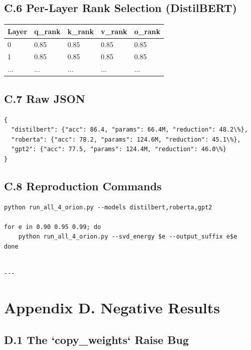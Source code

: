 \subsection{C.6 Per-Layer Rank Selection (DistilBERT)}

\begin{table}[H]
\centering
\small
\begin{tabular}{lllll}
\toprule
\textbf{Layer} & \textbf{q\_rank} & \textbf{k\_rank} & \textbf{v\_rank} & \textbf{o\_rank} \\
\midrule
0 & 0.85 & 0.85 & 0.85 & 0.85 \\
1 & 0.85 & 0.85 & 0.85 & 0.85 \\
... & ... & ... & ... & ... \\
\bottomrule
\end{tabular}
\end{table}

\subsection{C.7 Raw JSON}

\begin{lstlisting}
{
  "distilbert": {"acc": 86.4, "params": 66.4M, "reduction": 48.2\%},
  "roberta": {"acc": 78.2, "params": 124.6M, "reduction": 45.1\%},
  "gpt2": {"acc": 77.5, "params": 124.4M, "reduction": 46.0\%}
}
\end{lstlisting}

\subsection{C.8 Reproduction Commands}

\begin{lstlisting}
python run_all_4_orion.py --models distilbert,roberta,gpt2

for e in 0.90 0.95 0.99; do
    python run_all_4_orion.py --svd_energy $e --output_suffix e$e
done
\end{lstlisting}
\begin{lstlisting}

---
\end{lstlisting}


\section{Appendix D. Negative Results}

\subsection{D.1 The `copy\_weights` Raise Bug}

